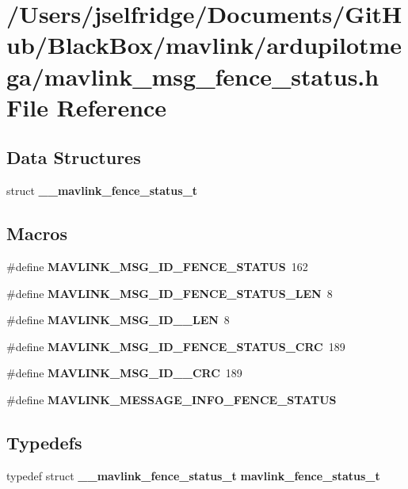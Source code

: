 \section{/\+Users/jselfridge/\+Documents/\+Git\+Hub/\+Black\+Box/mavlink/ardupilotmega/mavlink\+\_\+msg\+\_\+fence\+\_\+status.h File Reference}
\label{mavlink__msg__fence__status_8h}
\subsection*{Data Structures}
\begin{DoxyCompactItemize}
\item 
struct \textbf{ \+\_\+\+\_\+mavlink\+\_\+fence\+\_\+status\+\_\+t}
\end{DoxyCompactItemize}
\subsection*{Macros}
\begin{DoxyCompactItemize}
\item 
\#define \textbf{ M\+A\+V\+L\+I\+N\+K\+\_\+\+M\+S\+G\+\_\+\+I\+D\+\_\+\+F\+E\+N\+C\+E\+\_\+\+S\+T\+A\+T\+US}~162
\item 
\#define \textbf{ M\+A\+V\+L\+I\+N\+K\+\_\+\+M\+S\+G\+\_\+\+I\+D\+\_\+\+F\+E\+N\+C\+E\+\_\+\+S\+T\+A\+T\+U\+S\+\_\+\+L\+EN}~8
\item 
\#define \textbf{ M\+A\+V\+L\+I\+N\+K\+\_\+\+M\+S\+G\+\_\+\+I\+D\+\_\+\_\+\+L\+EN}~8
\item 
\#define \textbf{ M\+A\+V\+L\+I\+N\+K\+\_\+\+M\+S\+G\+\_\+\+I\+D\+\_\+\+F\+E\+N\+C\+E\+\_\+\+S\+T\+A\+T\+U\+S\+\_\+\+C\+RC}~189
\item 
\#define \textbf{ M\+A\+V\+L\+I\+N\+K\+\_\+\+M\+S\+G\+\_\+\+I\+D\+\_\+\_\+\+C\+RC}~189
\item 
\#define \textbf{ M\+A\+V\+L\+I\+N\+K\+\_\+\+M\+E\+S\+S\+A\+G\+E\+\_\+\+I\+N\+F\+O\+\_\+\+F\+E\+N\+C\+E\+\_\+\+S\+T\+A\+T\+US}
\end{DoxyCompactItemize}
\subsection*{Typedefs}
\begin{DoxyCompactItemize}
\item 
typedef struct \textbf{ \+\_\+\+\_\+mavlink\+\_\+fence\+\_\+status\+\_\+t} \textbf{ mavlink\+\_\+fence\+\_\+status\+\_\+t}
\end{DoxyCompactItemize}


